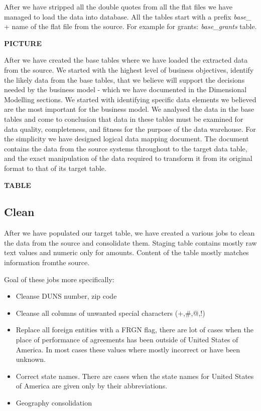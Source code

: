 \documentclass[letterpaper,12pt,oneside]{sphinxmanual}
\begin{document}
After we have stripped all the double quotes from all  the flat files we have managed to load the data into database.
All the tables start with a prefix \emph{base\_} + name of the flat file from the source. For example for grants: \emph{base\_grants} table.

\textbf{PICTURE}

After we have created the base tables where we have loaded the extracted data from the source.
We started with the highest level of business objectives, identify the likely data from the base tables,
that we believe will support the decisions needed by the business model - which we have documented in the
Dimensional Modelling sections. We started with identifying specific data elements we believed are the most
important for the business model. We analysed the data in the base tables and come to conclusion that data in these
tables must be examined for data quality, completeness, and fitness for the purpose of the data warehouse. For the simplicity
we have designed logical data mapping document. The document contains the data from the source systems throughout to the target
data table, and the exact manipulation of the data required to transform it from its original format to that of its target table.

\textbf{TABLE}


\subsection{Clean}
\label{datawarehouse:clean}
After we have populated our target table, we have created a various jobs to clean the data from the source and consolidate them.
Staging table contains mostly raw text values and numeric only for amounts. Content of the table mostly matches information fromthe source.

Goal of these jobs more specifically:
\begin{itemize}
\item {} 
Cleanse DUNS number, zip code

\item {} 
Cleanse all columns of unwanted special characters (+,\#,@,!)

\item {} 
Replace all foreign entities with a FRGN flag, there are lot of cases when the place of performance of agreements has been outside of United States of America. In most cases these values where mostly incorrect or have been unknown.

\item {} 
Correct state names. There are cases when the state names for United States of America are given only by their abbreviations.

\item {} 
Geography consolidation

\end{itemize}
\end{document}

